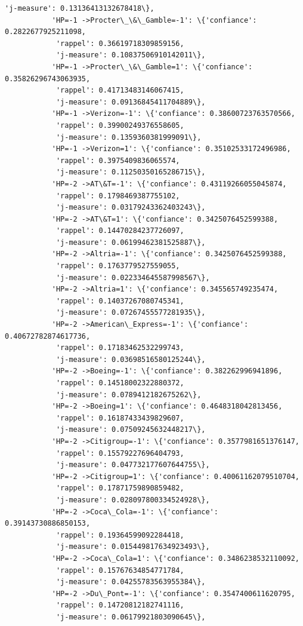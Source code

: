 \documentclass[11pt]{article}
\begin{document}
\begin{Verbatim}[commandchars=\\\{\}]
            'j-measure': 0.13136413132678418\},
           'HP=-1 ->Procter\_\&\_Gamble=-1': \{'confiance': 0.2822677925211098,
            'rappel': 0.36619718309859156,
            'j-measure': 0.10837506910142011\},
           'HP=-1 ->Procter\_\&\_Gamble=1': \{'confiance': 0.35826296743063935,
            'rappel': 0.41713483146067415,
            'j-measure': 0.09136845411704889\},
           'HP=-1 ->Verizon=-1': \{'confiance': 0.38600723763570566,
            'rappel': 0.39900249376558605,
            'j-measure': 0.1359360381999091\},
           'HP=-1 ->Verizon=1': \{'confiance': 0.35102533172496986,
            'rappel': 0.3975409836065574,
            'j-measure': 0.11250350165286715\},
           'HP=-2 ->AT\&T=-1': \{'confiance': 0.43119266055045874,
            'rappel': 0.1798469387755102,
            'j-measure': 0.03179243362403243\},
           'HP=-2 ->AT\&T=1': \{'confiance': 0.3425076452599388,
            'rappel': 0.14470284237726097,
            'j-measure': 0.06199462381525887\},
           'HP=-2 ->Altria=-1': \{'confiance': 0.3425076452599388,
            'rappel': 0.1763779527559055,
            'j-measure': 0.022334645587998567\},
           'HP=-2 ->Altria=1': \{'confiance': 0.345565749235474,
            'rappel': 0.14037267080745341,
            'j-measure': 0.07267455577281935\},
           'HP=-2 ->American\_Express=-1': \{'confiance': 0.40672782874617736,
            'rappel': 0.17183462532299743,
            'j-measure': 0.03698516580125244\},
           'HP=-2 ->Boeing=-1': \{'confiance': 0.382262996941896,
            'rappel': 0.14518002322880372,
            'j-measure': 0.0789412182675262\},
           'HP=-2 ->Boeing=1': \{'confiance': 0.4648318042813456,
            'rappel': 0.16187433439829607,
            'j-measure': 0.07509245632448217\},
           'HP=-2 ->Citigroup=-1': \{'confiance': 0.3577981651376147,
            'rappel': 0.15579227696404793,
            'j-measure': 0.047732177607644755\},
           'HP=-2 ->Citigroup=1': \{'confiance': 0.40061162079510704,
            'rappel': 0.17871759890859482,
            'j-measure': 0.028097800334524928\},
           'HP=-2 ->Coca\_Cola=-1': \{'confiance': 0.39143730886850153,
            'rappel': 0.19364599092284418,
            'j-measure': 0.015449817634923493\},
           'HP=-2 ->Coca\_Cola=1': \{'confiance': 0.3486238532110092,
            'rappel': 0.15767634854771784,
            'j-measure': 0.04255783563955384\},
           'HP=-2 ->Du\_Pont=-1': \{'confiance': 0.3547400611620795,
            'rappel': 0.14720812182741116,
            'j-measure': 0.06179921803090645\},

\end{Verbatim}
\end{document}
